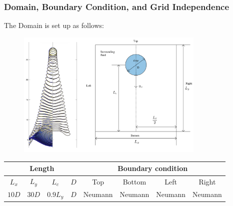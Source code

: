 \documentclass[12pt]{article}
\begin{document}
\subsubsection{Domain, Boundary Condition, and Grid Independence}
The Domain is set up as follows:
\begin{figure}[H]
    \centering
    \includegraphics[width=0.8\textwidth]{Latex/figures/Domain_and_Grid_indep.jpg}
    \label{deformation}
\end{figure}



\begin{table}[ht]
\scriptsize
\centering
\renewcommand{\arraystretch}{1.5} %
\begin{tabular}{|c|c|c|c|c|c|c|c|}
\hline
\multicolumn{4}{|c|}{\textbf{Length}} & \multicolumn{4}{c|}{\textbf{Boundary condition}} \\
\hline
$L_x$ & $L_y$ & $L_c$ & $D$   & Top & Bottom & Left & Right \\
\hline
$10D$ & $30D$ & $0.9L_y$ & $D$   & Neumann & Neumann & Neumann & Neumann \\
\hline
\end{tabular}
\end{table}
\end{document}
